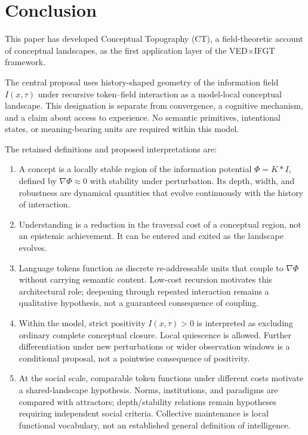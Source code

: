 
\section{Conclusion}
\label{sec:conclusion}

This paper has developed Conceptual Topography (CT), a field-theoretic
account of conceptual landscapes, as the first application layer of the
VED$\times$IFGT framework.

The central proposal uses history-shaped geometry of the information
field $I(x,\tau)$ under recursive token--field interaction as a model-local
conceptual landscape. This designation is separate from convergence,
a cognitive mechanism, and a claim about access to experience.
No semantic primitives, intentional states, or meaning-bearing
units are required within this model.

The retained definitions and proposed interpretations are:

\begin{enumerate}
  \item A concept is a locally stable region of the information
        potential $\Phi = K*I$, defined by $\nabla\Phi\approx 0$
        with stability under perturbation.
        Its depth, width, and robustness are dynamical quantities
        that evolve continuously with the history of interaction.

  \item Understanding is a reduction in the traversal cost of a
        conceptual region, not an epistemic achievement.
        It can be entered and exited as the landscape evolves.

  \item Language tokens function as discrete re-addressable units
        that couple to $\nabla\Phi$ without carrying semantic content.
        Low-cost recursion motivates this architectural role;
        deepening through repeated interaction remains a qualitative
        hypothesis, not a guaranteed consequence of coupling.

  \item Within the model, strict positivity $I(x,\tau)>0$ is interpreted
        as excluding ordinary complete conceptual closure.
        Local quiescence is allowed. Further differentiation under new
        perturbations or wider observation windows is a conditional
        proposal, not a pointwise consequence of positivity.

  \item At the social scale, comparable token functions under different
        costs motivate a shared-landscape hypothesis.
        Norms, institutions, and paradigms are compared with attractors;
        depth/stability relations remain hypotheses requiring independent
        social criteria. Collective maintenance is local functional
        vocabulary, not an established general definition of intelligence.
\end{enumerate}

